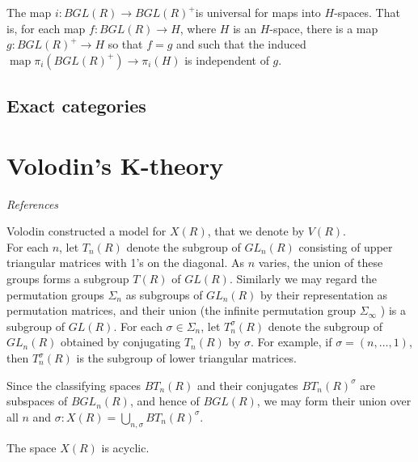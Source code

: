 \begin{theo} %
The map $i: B G L(R) \rightarrow B G L(R)^{+}$is universal for maps into $H$-spaces. That is, for each map $f: B G L(R) \rightarrow H$, where $H$ is an $H$-space, there is a map $g: B G L(R)^{+} \rightarrow H$ so that $f=g$ and such that the induced $\operatorname{map} \pi_i\left(B G L(R)^{+}\right) \rightarrow \pi_i(H)$ is independent of $g$.
\end{theo}

\section{Exact categories}



\chapter{Volodin's K-theory}

\textit{References} \cite{weibelKbookIntroductionAlgebraic2013a,suslinEquivalenceKtheories1981c,suslinStabilityAlgebraicKtheory1982}

Volodin constructed a model for $X(R)$, that we denote by $V(R)$. \\
For each $n$, let $T_n(R)$ denote the subgroup of $G L_n(R)$ consisting of upper triangular matrices with 1's on the diagonal. As $n$ varies, the union of these groups forms a subgroup $T(R)$ of $G L(R)$. Similarly we may regard the permutation groups $\Sigma_n$ as subgroups of $G L_n(R)$ by their representation as permutation matrices, and their union (the infinite permutation group $\Sigma_{\infty}$ ) is a subgroup of $G L(R)$. For each $\sigma \in \Sigma_n$, let $T_n^\sigma(R)$ denote the subgroup of $G L_n(R)$ obtained by conjugating $T_n(R)$ by $\sigma$. For example, if $\sigma=(n, \ldots, 1)$, then $T_n^\sigma(R)$ is the subgroup of lower triangular matrices.

Since the classifying spaces $B T_n(R)$ and their conjugates $B T_n(R)^\sigma$ are subspaces of $B G L_n(R)$, and hence of $B G L(R)$, we may form their union over all $n$ and $\sigma: X(R)=\bigcup_{n, \sigma} B T_n(R)^\sigma$. 


\begin{theo}
    The space $X(R)$ is acyclic. 
\end{theo}









